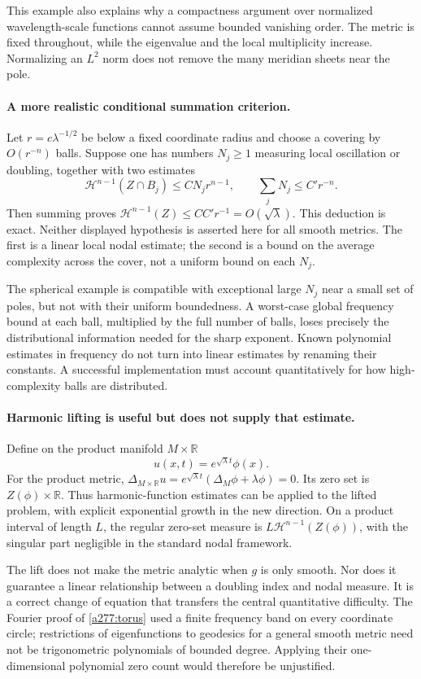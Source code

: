 \documentclass[11pt]{article}
\begin{document}
This example also explains why a compactness argument over normalized
wavelength-scale functions cannot assume bounded vanishing order.
The metric is fixed throughout, while the eigenvalue and the local
multiplicity increase. Normalizing an $L^2$ norm does not remove the
many meridian sheets near the pole.

\paragraph{A more realistic conditional summation criterion.}
Let $r=c\lambda^{-1/2}$ be below a fixed coordinate radius and choose
a covering by $O(r^{-n})$ balls. Suppose one has numbers $N_j\ge1$
measuring local oscillation or doubling, together with two estimates
\[
 \mathcal H^{n-1}(Z\cap B_j)\le C N_j r^{n-1},
 \qquad \sum_jN_j\le C' r^{-n}.
\]
Then summing proves
$\mathcal H^{n-1}(Z)\le CC' r^{-1}=O(\sqrt\lambda)$.
This deduction is exact. Neither displayed hypothesis is asserted here
for all smooth metrics. The first is a linear local nodal estimate;
the second is a bound on the average complexity across the cover,
not a uniform bound on each $N_j$.

The spherical example is compatible with exceptional large $N_j$ near
a small set of poles, but not with their uniform boundedness. A worst-case
global frequency bound at each ball, multiplied by the full number
of balls, loses precisely the distributional information needed for
the sharp exponent. Known polynomial estimates in frequency do not
turn into linear estimates by renaming their constants. A successful
implementation must account quantitatively for how high-complexity
balls are distributed.

\paragraph{Harmonic lifting is useful but does not supply that estimate.}
Define on the product manifold $M\times\mathbb R$
\[
                   u(x,t)=e^{\sqrt\lambda t}\phi(x).
\]
For the product metric,
$\Delta_{M\times\mathbb R}u=e^{\sqrt\lambda t}
(\Delta_M\phi+\lambda\phi)=0$.
Its zero set is $Z(\phi)\times\mathbb R$. Thus harmonic-function
estimates can be applied to the lifted problem, with explicit
exponential growth in the new direction. On a product interval of
length $L$, the regular zero-set measure is
$L\mathcal H^{n-1}(Z(\phi))$, with the singular part negligible in
the standard nodal framework.

The lift does not make the metric analytic when $g$ is only smooth.
Nor does it guarantee a linear relationship between a doubling index
and nodal measure. It is a correct change of equation that transfers
the central quantitative difficulty. The Fourier proof of
\eqref{a277:torus} used a finite frequency band on every coordinate
circle; restrictions of eigenfunctions to geodesics for a general
smooth metric need not be trigonometric polynomials of bounded degree.
Applying their one-dimensional polynomial zero count would therefore
be unjustified.
\end{document}
